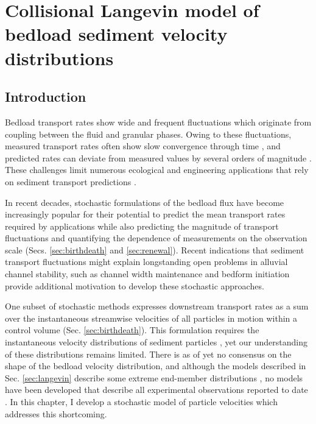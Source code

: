 
\chapter{Collisional Langevin model of bedload sediment velocity distributions}
\label{ch:langevin}
\section{Introduction}

Bedload transport rates show wide and frequent fluctuations which originate from coupling between the fluid and granular phases.
Owing to these fluctuations, measured transport rates often show slow convergence through time \citep{Dhont2018,Turowski2010}, and predicted rates can deviate from measured values by several orders of magnitude \citep{Recking2012,Martin2003}.
These challenges limit numerous ecological and engineering applications that rely on sediment transport predictions \citep{Gaeuman2017,Malmon2005}.

In recent decades, stochastic formulations of the bedload flux have become increasingly popular for their potential to predict the mean transport rates required by applications while also predicting the magnitude of transport fluctuations and quantifying the dependence of measurements on the observation scale (Secs. \ref{sec:birthdeath} and \ref{sec:renewal}).
Recent indications that sediment transport fluctuations might explain longstanding open problems in alluvial channel stability, such as channel width maintenance \citep{Abramian2019,Abramian2020} and bedform initiation \citep{Jerolmack2005,Bohorquez2016} provide additional motivation to develop these stochastic approaches.

One subset of stochastic methods expresses downstream transport rates as a sum over the instantaneous streamwise velocities of all particles in motion within a control volume (Sec. \ref{sec:birthdeath}).
This formulation requires the instantaneous velocity distributions of sediment particles \citep[e.g.][]{Ancey2020a}, yet our understanding of these distributions remains limited.
There is as of yet no consensus on the shape of the bedload velocity distribution, and although the models described in Sec. \ref{sec:langevin} describe some extreme end-member distributions \citep[e.g.][]{Fan2014,Ancey2014}, no models have been developed that describe all experimental observations reported to date \citep{Lajeunesse2010,Fathel2015,Heyman2016,Liu2019,Houssais2012}.
In this chapter, I develop a stochastic model of particle velocities which addresses this shortcoming.

